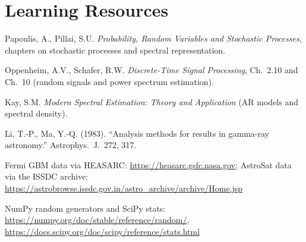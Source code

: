 \documentclass[11pt,a4paper]{article}
\begin{document}
\section*{Learning Resources}
\begin{resources}
  \item Papoulis, A., Pillai, S.U. \emph{Probability, Random Variables and Stochastic Processes}, chapters on stochastic processes and spectral representation.
  \item Oppenheim, A.V., Schafer, R.W. \emph{Discrete-Time Signal Processing}, Ch.~2.10 and Ch.~10 (random signals and power spectrum estimation).
  \item Kay, S.M. \emph{Modern Spectral Estimation: Theory and Application} (AR models and spectral density).
\end{resources}
\begin{resources}
  \item Li, T.-P., Ma, Y.-Q. (1983). ``Analysis methods for results in gamma-ray astronomy.'' Astrophys.\ J.\ 272, 317.
  \item Fermi GBM data via HEASARC: \url{https://heasarc.gsfc.nasa.gov}; AstroSat data via the ISSDC archive: \url{https://astrobrowse.issdc.gov.in/astro_archive/archive/Home.jsp}
\end{resources}
\begin{resources}
  \item NumPy random generators and SciPy stats: \url{https://numpy.org/doc/stable/reference/random/}, \url{https://docs.scipy.org/doc/scipy/reference/stats.html}
\end{resources}

\evaluation
\end{document}
